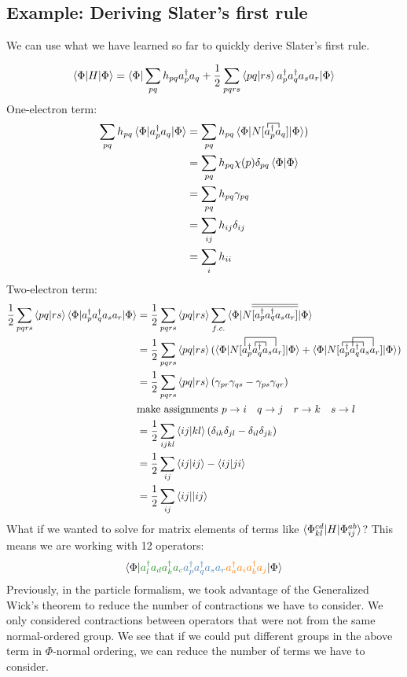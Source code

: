 \documentclass{article}
\newcommand{\ol}{\overline}
\newcommand{\fctr}{\contraction}
\newcommand{\dg}{\ensuremath{^\dagger} }
\def\cb#1{{\color{blue}#1}}
\def\co#1{{\color{orange}#1}}
\def\cg#1{{\color{green}#1}}
\begin{document}
\subsection{Example: Deriving Slater's first rule} 

We can use what we have learned so far to quickly derive Slater's first rule. 

\[\braket{\Phi | H | \Phi} = \braket{\Phi | \sum_{pq} h_{pq} a_p\dg a_q + \frac{1}{2} \sum_{pqrs} \braket{pq | rs} a_p\dg a_q\dg a_s a_r | \Phi} \]
One-electron term: 
\begin{align*}
 \sum_{pq} h_{pq} \braket{\Phi | a_p\dg a_q | \Phi} &=   \sum_{pq} h_{pq} \braket{\Phi | N[\fctr{}{a}{{}_p\dg}{a} a_p\dg a_q] | \Phi}) \\
 &=   \sum_{pq} h_{pq} \chi(p)\delta_{pq} \braket{\Phi | \Phi}  \\
 &=  \sum_{pq} h_{pq} \gamma_{pq} \\
 &=  \sum_{ij} h_{ij}\delta_{ij} \\
 &= \sum_i h_{ii}
\end{align*}
Two-electron term: 
\begin{align*}
\frac{1}{2} \sum_{pqrs} \braket{pq | rs} \braket{\Phi| a_p\dg a_q\dg a_s a_r | \Phi} &= \frac{1}{2} \sum_{pqrs} \braket{pq | rs}  \sum_{f.c.}\braket{\Phi| N\ol{\ol{[a_p\dg a_q\dg a_s a_r]}} | \Phi} \\
&=  \frac{1}{2} \sum_{pqrs} \braket{pq | rs} ( \braket{\Phi| N[\fctr[2ex]{}{a}{{}_p\dg a_q\dg a_s}{a} \fctr{a_p\dg }{a}{{}_q\dg}{a} a_p\dg a_q\dg a_s a_r] | \Phi} 
+ \braket{\Phi| N[ \fctr{}{a}{{}_p\dg a_q\dg}{a}  \fctr[2ex]{a_p\dg }{a}{{}_q\dg a_s}{a} a_p\dg a_q\dg a_s a_r] | \Phi} )\\
&= \frac{1}{2} \sum_{pqrs} \braket{pq | rs}  (\gamma_{pr}\gamma_{qs} - \gamma_{ps}\gamma_{qr}) \\
&\text{make assignments } p\rightarrow i \quad  q \rightarrow j \quad  r\rightarrow k \quad  s\rightarrow l \\
&= \frac{1}{2} \sum_{ijkl} \braket{ij | kl}  (\delta_{ik}\delta_{jl} - \delta_{il}\delta_{jk}) \\
&= \frac{1}{2} \sum_{ij}  \braket{ij | ij} -   \braket{ij | ji} \\
&= \frac{1}{2} \sum_{ij} \braket{ij || ij} 
\end{align*}
What if we wanted to solve for matrix elements of terms like $ \braket{\Phi_{kl}^{cd} | H |\Phi_{ij}^{ab}}$?
This means we are working with 12 operators: 
\[\braket{\Phi | \cg{a_l\dg a_d a_k\dg a_c }\cb{  a_p\dg a_q\dg a_s a_r } \co{a_a\dg a_i a_b\dg a_j } | \Phi} \]
Previously, in the particle formalism, we took advantage of the Generalized Wick's theorem to reduce the number of contractions we have to consider.
We only considered contractions between operators that were not from the same normal-ordered group. 
We see that if we could put different groups in the above term in $\Phi$-normal ordering, we can reduce the number of terms we have to consider.
\end{document}
